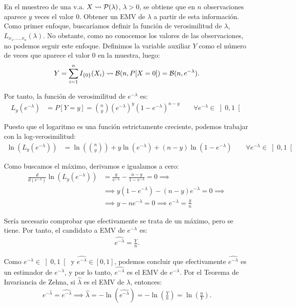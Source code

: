 \begin{ejemplo}
    En el muestreo de una v.a. $X \rightsquigarrow \mathcal{P}(\lambda)$, $\lambda > 0$, se obtiene que en $n$ observaciones aparece $y$ veces el valor $0$. Obtener un EMV de $\lambda$ a partir de esta información.\\

    Como primer enfoque, buscaríamos definir la función de verosimilitud de $\lambda$, $L_{x_1, \ldots, x_n}(\lambda)$. No obstante, como no conocemos los valores de las observaciones, no podemos seguir este enfoque. Definimos la variable auxiliar $Y$ como el número de veces que aparece el valor $0$ en la muestra, luego:
    \begin{align*}
        Y = \sum_{i=1}^{n} I_{\{0\}}(X_i) \rightsquigarrow \mathcal{B}(n, P[X = 0]) = \mathcal{B}(n, e^{-\lambda}).
    \end{align*}

    Por tanto, la función de verosimilitud de $e^{-\lambda}$ es:
    \begin{align*}
        L_{y}(e^{-\lambda}) &= P[Y = y] = \binom{n}{y} (e^{-\lambda})^y (1 - e^{-\lambda})^{n - y} \qquad \forall e^{-\lambda} \in \left]0, 1\right[
    \end{align*}

    Puesto que el logaritmo es una función estrictamente creciente, podemos trabajar con la log-verosimilitud:
    \begin{align*}
        \ln(L_{y}(e^{-\lambda})) &= \ln\left(\binom{n}{y}\right) + y\ln(e^{-\lambda}) + (n - y)\ln(1 - e^{-\lambda}) \qquad \forall e^{-\lambda} \in \left]0, 1\right[
    \end{align*}

    Como buscamos el máximo, derivamos e igualamos a cero:
    \begin{align*}
        \frac{d}{d(e^{-\lambda})} \ln(L_{y}(e^{-\lambda})) &= \frac{y}{e^{-\lambda}} - \frac{n - y}{1 - e^{-\lambda}} = 0 \implies \\&\implies y(1 - e^{-\lambda}) - (n - y)e^{-\lambda} = 0 \implies \\&\implies y - ne^{-\lambda} = 0 \implies e^{-\lambda} = \frac{y}{n}
    \end{align*}

    Sería necesario comprobar que efectivamente se trata de un máximo, pero se tiene. Por tanto, el candidato a EMV de $e^{-\lambda}$ es:
    \begin{align*}
        \widehat{e^{-\lambda}} = \frac{Y}{n}.
    \end{align*}

    Como $e^{-\lambda} \in \left]0, 1\right[$ y $\widehat{e^{-\lambda}} \in \left[0, 1\right]$, podemos concluir que efectivamente $\widehat{e^{-\lambda}}$ es un estimador de $e^{-\lambda}$, y por lo tanto, $\widehat{e^{-\lambda}}$ es el EMV de $e^{-\lambda}$. Por el Teorema de Invariancia de Zehna, si $\widehat{\lambda}$ es el EMV de $\lambda$, entonces:
    \begin{align*}
        e^{-\widehat{\lambda}} = \widehat{e^{-\lambda}} \implies \widehat{\lambda} = -\ln(\widehat{e^{-\lambda}}) = -\ln\left(\frac{Y}{n}\right) = \ln\left(\frac{n}{Y}\right).
    \end{align*}
\end{ejemplo}

